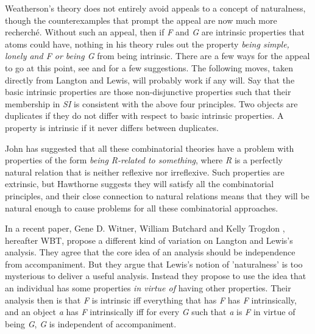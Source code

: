 Weatherson's theory does not entirely avoid appeals to a concept of naturalness, though the counterexamples that prompt the appeal are now much more recherch\'{e}. Without such an appeal, then if \textit{F} and \textit{G} are intrinsic properties that atoms could have, nothing in his theory rules out the property \textit{being simple, lonely and F or being G} from being intrinsic. There are a few ways for the appeal to go at this point, see \citet{Weatherson2001-WEAIPA} and \citet{Lewis2001b} for a few suggestions. The following moves, taken directly from Langton and Lewis, will probably work if any will. Say that the basic intrinsic properties are those non-disjunctive properties such that their membership in \textit{SI} is consistent with the above four principles. Two objects are duplicates if they do not differ with respect to basic intrinsic properties. A property is intrinsic if it never differs between duplicates.

John \citet{Hawthorne2001} has suggested that all these combinatorial theories have a problem with properties of the form \textit{being R-related to something}, where \textit{R} is a perfectly natural relation that is neither reflexive nor irreflexive. Such properties are extrinsic, but Hawthorne suggests they will satisfy all the combinatorial principles, and their close connection to natural relations means that they will be natural enough to cause problems for all these combinatorial approaches.

In a recent paper, Gene D. Witner, William Butchard and Kelly Trogdon \citeyearpar{WitnerButchardTrogdon2005}, hereafter WBT, propose a different kind of variation on Langton and Lewis's analysis. They agree that the core idea of an analysis should be independence from accompaniment. But they argue that Lewis's notion of 'naturalness' is too mysterious to deliver a useful analysis. Instead they propose to use the idea that an individual has some properties \textit{in virtue of} having other properties. Their analysis then is that \textit{F} is intrinsic iff everything that has \textit{F} has \textit{F} intrinsically, and an object \textit{a} has \textit{F} intrinsically iff for every \textit{G} such that \textit{a} is \textit{F} in virtue of being \textit{G}, \textit{G} is independent of accompaniment.

